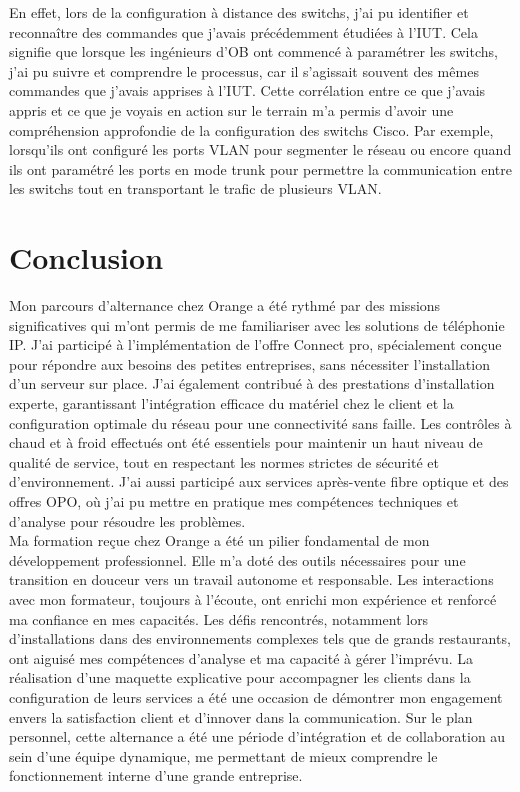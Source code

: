 \documentclass[12pt, a4paper]{article}
\begin{document}
En effet, lors de la configuration à distance des switchs,
j'ai pu identifier et reconnaître des commandes que j'avais
précédemment étudiées à l'IUT. Cela signifie que lorsque les
ingénieurs d'OB ont commencé à paramétrer 
les switchs, j'ai pu suivre et comprendre le processus,
car il s'agissait souvent des mêmes commandes que j'avais apprises à
l'IUT. Cette corrélation entre ce que j'avais appris et ce que
je voyais en action sur le terrain m'a permis d'avoir une
compréhension approfondie de la configuration des switchs Cisco.
Par exemple, lorsqu'ils ont configuré les ports VLAN
pour segmenter le réseau ou encore quand ils ont 
paramétré les ports en mode trunk pour permettre
la communication entre les switchs tout en 
transportant le trafic de plusieurs VLAN.\\

\newpage
\section{Conclusion}
Mon parcours d'alternance chez Orange a été rythmé par des missions
significatives qui m'ont permis de me familiariser avec les solutions
de téléphonie IP. J'ai participé à
l'implémentation de l'offre Connect pro, spécialement conçue pour
répondre aux besoins des petites entreprises, sans nécessiter
l'installation d'un serveur sur place. J'ai également
contribué à des prestations d'installation experte, garantissant
l'intégration efficace du matériel chez le client et la configuration
optimale du réseau pour une connectivité sans faille. Les contrôles
à chaud et à froid effectués ont été essentiels pour maintenir un
haut niveau de qualité de service, tout en respectant les normes
strictes de sécurité et d'environnement. J'ai aussi participé
aux services après-vente fibre optique et des offres
OPO, où j'ai pu mettre en pratique mes
compétences techniques et d'analyse pour résoudre les problèmes.\\

Ma formation reçue chez Orange a été un pilier fondamental de mon
développement professionnel. Elle m'a doté des outils nécessaires
pour une transition en douceur vers un travail autonome et responsable.
Les interactions avec mon formateur, toujours à l'écoute, ont enrichi
mon expérience et renforcé ma confiance en mes capacités. Les défis
rencontrés, notamment lors d'installations 
dans des environnements complexes tels que de grands restaurants,
ont aiguisé mes compétences d'analyse et ma capacité à gérer l'imprévu.
La réalisation d'une maquette explicative pour accompagner les clients
dans la configuration de leurs services a été une occasion de démontrer
mon engagement envers la satisfaction client et d'innover dans la
communication. Sur le plan personnel, cette alternance a
été une période d'intégration et de collaboration au sein d'une équipe
dynamique, me permettant de mieux comprendre le fonctionnement interne
d'une grande entreprise.\\
\end{document}
